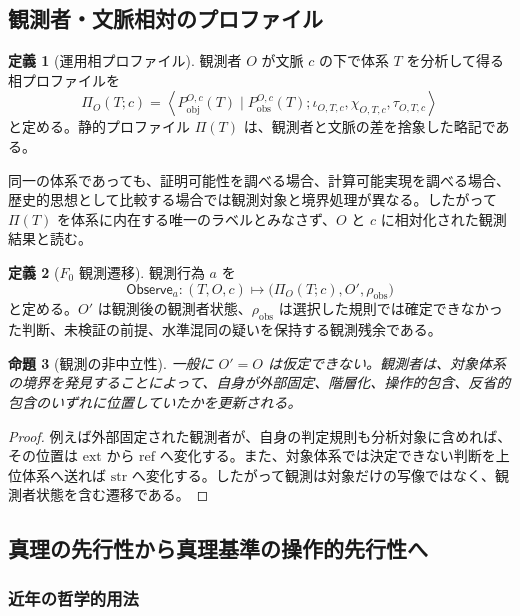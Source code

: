 \documentclass[a4paper,11pt]{ltjsarticle}
\theoremstyle{definition}
\newtheorem{definition}{定義}[section]
\theoremstyle{plain}
\newtheorem{proposition}[definition]{命題}
\newcommand{\Phase}{\Pi}
\newcommand{\Pobj}{P_{\mathrm{obj}}}
\newcommand{\Pobs}{P_{\mathrm{obs}}}
\newcommand{\Observe}{\mathsf{Observe}}
\newcommand{\Residual}{\rho_{\mathrm{obs}}}
\begin{document}
\subsection{観測者・文脈相対のプロファイル}

\begin{definition}[運用相プロファイル]
観測者 $O$ が文脈 $c$ の下で体系 $T$ を分析して得る相プロファイルを
\[
 \Phase_O(T;c)
 =
 \left\langle
 \Pobj^{O,c}(T)\mid\Pobs^{O,c}(T);
 \iota_{O,T,c},\chi_{O,T,c},\tau_{O,T,c}
 \right\rangle
\]
と定める。静的プロファイル $\Phase(T)$ は、観測者と文脈の差を捨象した略記である。
\end{definition}

同一の体系であっても、証明可能性を調べる場合、計算可能実現を調べる場合、歴史的思想として比較する場合では観測対象と境界処理が異なる。したがって $\Phase(T)$ を体系に内在する唯一のラベルとみなさず、$O$ と $c$ に相対化された観測結果と読む。

\begin{definition}[$F_0$ 観測遷移]
観測行為 $a$ を
\[
 \Observe_a:
 (T,O,c)
 \longmapsto
 \bigl(\Phase_O(T;c),O',\Residual\bigr)
\]
と定める。$O'$ は観測後の観測者状態、$\Residual$ は選択した規則では確定できなかった判断、未検証の前提、水準混同の疑いを保持する観測残余である。
\end{definition}

\begin{proposition}[観測の非中立性]
一般に $O'=O$ は仮定できない。観測者は、対象体系の境界を発見することによって、自身が外部固定、階層化、操作的包含、反省的包含のいずれに位置していたかを更新される。
\end{proposition}

\begin{proof}
例えば外部固定された観測者が、自身の判定規則も分析対象に含めれば、その位置は $\mathrm{ext}$ から $\mathrm{ref}$ へ変化する。また、対象体系では決定できない判断を上位体系へ送れば $\mathrm{str}$ へ変化する。したがって観測は対象だけの写像ではなく、観測者状態を含む遷移である。
\end{proof}

\subsection{真理の先行性から真理基準の操作的先行性へ}

\subsubsection{近年の哲学的用法}
\end{document}
